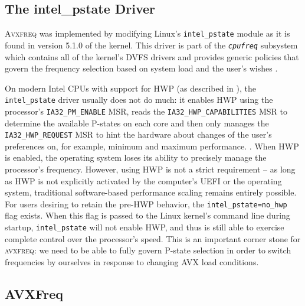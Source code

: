 \subsection{The intel\_pstate Driver}
\label{sec:design:reimplementation:intel_pstate}

\textsc{Avxfreq} was implemented by modifying \gls{Linux}'s \texttt{intel\_pstate} module as it is found in version 5.1.0 of the kernel. This driver is part of the \textit{\texttt{cpufreq}} subsystem which contains all of the kernel's \gls{DVFS} drivers and provides generic policies that govern the frequency selection based on system load and the user's wishes \cite{cpufreq}. %

On modern Intel \glspl{CPU} with support for \gls{HWP} (as described in ), the \texttt{intel\_pstate} driver usually does not do much: it enables \gls{HWP} using the processor's \texttt{IA32\_PM\_ENABLE} \gls{MSR}, reads the \texttt{IA32\_HWP\_CAPABILITIES} \gls{MSR} to determine the available \glspl{P-state} on each core and then only manages the \texttt{IA32\_HWP\_REQUEST} \gls{MSR} to hint the hardware about changes of the user's preferences on, for example, minimum and maximum performance. \cite{intelsdmsysprogguide} \cite{intelpstate}. When \gls{HWP} is enabled, the operating system loses its ability to precisely manage the processor's frequency. However, using \gls{HWP} is not a strict requirement -- as long as \gls{HWP} is not explicitly activated by the computer's \gls{UEFI} or the operating system, traditional software-based performance scaling remains entirely possible. For users desiring to retain the pre-\gls{HWP} behavior, the \texttt{intel\_pstate=no\_hwp} flag exists. When this flag is passed to the \gls{Linux} kernel's command line during startup, \texttt{intel\_pstate} will not enable \gls{HWP}, and thus is still able to exercise complete control over the processor's speed. This is an important corner stone for \textsc{avxfreq}: we need to be able to fully govern \gls{P-state} selection in order to switch frequencies by ourselves in response to changing \gls{AVX} load conditions.

\subsection{AVXFreq}
\label{sec:design:reimplementation:avxfreq}

